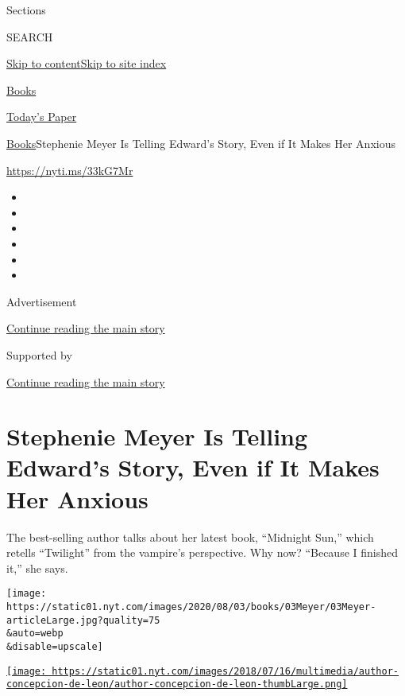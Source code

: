 Sections

SEARCH

\protect\hyperlink{site-content}{Skip to
content}\protect\hyperlink{site-index}{Skip to site index}

\href{https://www.nytimes.com/section/books}{Books}

\href{https://myaccount.nytimes.com/auth/login?response_type=cookie\&client_id=vi}{}

\href{https://www.nytimes.com/section/todayspaper}{Today's Paper}

\href{/section/books}{Books}\textbar{}Stephenie Meyer Is Telling
Edward's Story, Even if It Makes Her Anxious

\url{https://nyti.ms/33kG7Mr}

\begin{itemize}
\item
\item
\item
\item
\item
\item
\end{itemize}

Advertisement

\protect\hyperlink{after-top}{Continue reading the main story}

Supported by

\protect\hyperlink{after-sponsor}{Continue reading the main story}

\hypertarget{stephenie-meyer-is-telling-edwards-story-even-if-it-makes-her-anxious}{%
\section{Stephenie Meyer Is Telling Edward's Story, Even if It Makes Her
Anxious}\label{stephenie-meyer-is-telling-edwards-story-even-if-it-makes-her-anxious}}

The best-selling author talks about her latest book, ``Midnight Sun,''
which retells ``Twilight'' from the vampire's perspective. Why now?
``Because I finished it,'' she says.

\texttt{[image: https://static01.nyt.com/images/2020/08/03/books/03Meyer/03Meyer-articleLarge.jpg?quality=75\\\&auto=webp\\\&disable=upscale]}

\href{https://www.nytimes.com/by/concepcion-de-leon}{\texttt{[image: https://static01.nyt.com/images/2018/07/16/multimedia/author-concepcion-de-leon/author-concepcion-de-leon-thumbLarge.png]}}

